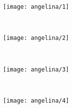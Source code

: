\begin{figure}
        \centering
        \begin{subfigure}[b]{0.2\textwidth}
                \centering
                \texttt{[image: angelina/1]}
        \end{subfigure}%
        ~ %
        \begin{subfigure}[b]{0.2\textwidth}
                \centering
                \texttt{[image: angelina/2]}
        \end{subfigure}
        ~
        \begin{subfigure}[b]{0.2\textwidth}
                \centering
                \texttt{[image: angelina/3]}
        \end{subfigure}%
        ~ %
        \begin{subfigure}[b]{0.2\textwidth}
                \centering
                \texttt{[image: angelina/4]}
        \end{subfigure}
%


\end{figure}
